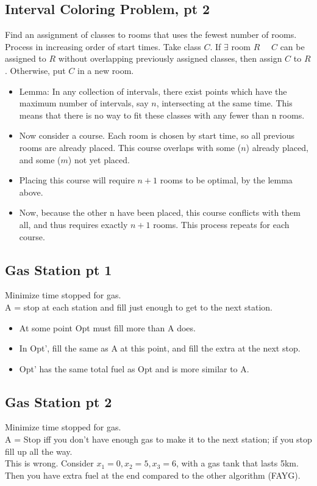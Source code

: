 \documentclass[12pt]{article}
\providecommand{\st}{\ \text{s.t.}\ }
\providecommand{\tightlist}{
    \setlength{\itemsep}{0pt}\setlength{\parskip}{0pt}
}
\begin{document}
\subsection{Interval Coloring Problem, pt 2}
Find an assignment of classes to rooms that uses the fewest number of rooms.\\
Process in increasing order of start times. Take class $C$. If $\exists$ room $R$ \st $C$ can be assigned to $R$ without overlapping previously assigned classes, then assign $C$ to $R$. Otherwise, put $C$ in a new room.
\begin{itemize}\tightlist
  \item Lemma: In any collection of intervals, there exist points which have the maximum number of intervals, say $n$, intersecting at the same time. This means that there is no way to fit these classes with any fewer than n rooms.
  \item Now consider a course. Each room is chosen by start time, so all previous rooms are already placed.
	This course overlaps with some ($n$) already placed, and some ($m$) not yet placed.
	\item Placing this course will require $n+1$ rooms to be optimal, by the lemma above.
	\item Now, because the other n have been placed, this course conflicts with them all, and thus requires exactly $n+1$ rooms. This process repeats for each course.
\end{itemize}


\subsection{Gas Station pt 1}
Minimize time stopped for gas.\\
A = stop at each station and fill just enough to get to the next station.
\begin{itemize}
  \item At some point Opt must fill more than A does.
  \item In Opt', fill the same as A at this point, and fill the extra at the next stop.
  \item Opt' has the same total fuel as Opt and is more similar to A.
\end{itemize}

\subsection{Gas Station pt 2}
Minimize time stopped for gas.\\
A =  Stop iff you don't have enough gas to make it to the next station; if you stop fill up all the way.\\
This is wrong. Consider $x_1 = 0, x_2 = 5, x_3 = 6$, with a gas tank that lasts 5km. Then you have extra fuel at the end compared to the other algorithm (FAYG).
\end{document}
